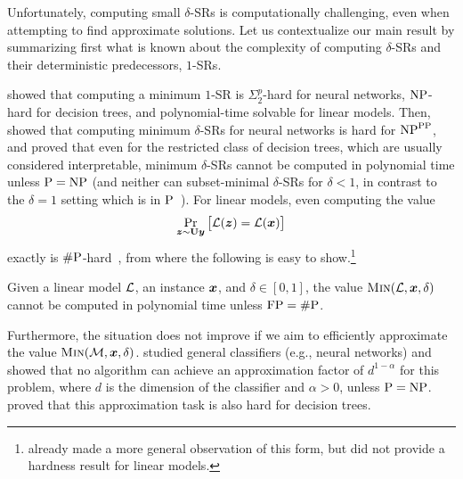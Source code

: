 

Unfortunately, computing small $\delta$-SRs is computationally challenging, even when attempting to find approximate solutions. Let us contextualize our main result by summarizing first what is known about the complexity of computing $\delta$-SRs and their deterministic predecessors, $1$-SRs.  

\citet{NEURIPS2020_b1adda14} showed that computing a minimum $1$-SR is $\Sigma_2^p$-hard for neural networks, $\mathrm{NP}$-hard for decision trees, and polynomial-time solvable for linear models. Then, \citet[Theorem 2.4]{Waldchen_MacDonald_Hauch_Kutyniok_2021} showed that computing minimum $\delta$-SRs for neural networks is hard for $\mathrm{NP}^{\mathrm{PP}}$, and \citet{NEURIPS2022_b8963f6a} proved that even for the restricted class of decision trees, which are usually considered interpretable, minimum $\delta$-SRs cannot be computed in polynomial time unless $\mathrm{P} = \mathrm{NP}$ (and neither can subset-minimal $\delta$-SRs for $\delta < 1$, in contrast to the $\delta = 1$ setting which is in $\mathrm{P}$~\cite{izzaExplainingDecisionTrees2020,roaModelInterpretabilityLens2020}). 
For linear models, even computing the value
\[
    \Pr_{{\bm{z}} \sim \mathbf{U}{{\bm{y}}}}\big[\mathcal{L}({\bm{z}}) = \mathcal{L}({\bm{x}})\big]
\]
exactly is $\mathrm{\#P}$-hard~\cite{NEURIPS2020_b1adda14}, from where the following is easy to show.\footnote{\citet{izzaComputingProbabilisticAbductive2023} already made a more general observation of this form, but did not provide a hardness result for linear models.}
 
\begin{proposition}\label{prop:hardness}
    Given a linear model $\mathcal{L}$, an instance
    ${\bm{x}}$, and $\delta \in [0,1]$, the value $\operatorname{\textsc{Min}}(\mathcal{L}, {\bm{x}}, \delta)$
    cannot be computed in polynomial time unless $\mathrm{FP} = \mathrm{\#P}$.
\end{proposition}

Furthermore, the situation does not improve if we aim to efficiently approximate the value $\operatorname{\textsc{Min}}(\mathcal{M}, {\bm{x}}, \delta)$. \citet[Theorem 2.5]{Waldchen_MacDonald_Hauch_Kutyniok_2021} studied general classifiers (e.g., neural networks) and showed that no algorithm can achieve an approximation factor of $d^{1-\alpha}$ for this problem, where $d$ is the dimension of the classifier and $\alpha > 0$, unless $\mathrm{P} = \mathrm{NP}$. \citet{Kozachinskiy_2023} proved that this approximation task is also hard for decision trees.


